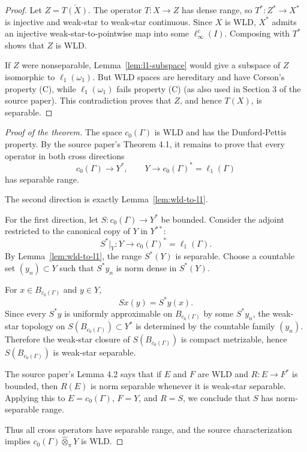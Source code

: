 \documentclass[11pt]{article}
\newcommand{\otpi}{\widehat{\otimes}_{\pi}}
\begin{document}
\begin{proof}
Let \(Z=\overline{T(X)}\). The operator \(T:X\to Z\) has dense range, so
\(T^*:Z^*\to X^*\) is injective and weak-star to weak-star continuous. Since
\(X\) is WLD, \(X^*\) admits an injective weak-star-to-pointwise map into some
\(\ell_\infty^c(I)\). Composing with \(T^*\) shows that \(Z\) is WLD.

If \(Z\) were nonseparable, Lemma~\ref{lem:l1-subspace} would give a subspace
of \(Z\) isomorphic to \(\ell_1(\omega_1)\). But WLD spaces are hereditary and
have Corson's property (C), while \(\ell_1(\omega_1)\) fails property (C)
(as also used in Section 3 of the source paper). This contradiction proves
that \(Z\), and hence \(T(X)\), is separable.
\end{proof}

\begin{proof}[Proof of the theorem]
The space \(c_0(\Gamma)\) is WLD and has the Dunford-Pettis property. By the
source paper's Theorem 4.1, it remains to prove that every operator in both
cross directions
\[
c_0(\Gamma)\to Y^*,\qquad Y\to c_0(\Gamma)^*=\ell_1(\Gamma)
\]
has separable range.

The second direction is exactly Lemma~\ref{lem:wld-to-l1}.

For the first direction, let \(S:c_0(\Gamma)\to Y^*\) be bounded. Consider
the adjoint restricted to the canonical copy of \(Y\) in \(Y^{**}\):
\[
S^*|_Y:Y\to c_0(\Gamma)^*=\ell_1(\Gamma).
\]
By Lemma~\ref{lem:wld-to-l1}, the range \(S^*(Y)\) is separable. Choose a
countable set \((y_n)\subset Y\) such that \(S^*y_n\) is norm dense in
\(S^*(Y)\).

For \(x\in B_{c_0(\Gamma)}\) and \(y\in Y\),
\[
Sx(y)=S^*y(x).
\]
Since every \(S^*y\) is uniformly approximable on \(B_{c_0(\Gamma)}\) by some
\(S^*y_n\), the weak-star topology on \(S(B_{c_0(\Gamma)})\subset Y^*\) is
determined by the countable family \((y_n)\). Therefore the weak-star closure
of \(S(B_{c_0(\Gamma)})\) is compact metrizable, hence
\(S(B_{c_0(\Gamma)})\) is weak-star separable.

The source paper's Lemma 4.2 says that if \(E\) and \(F\) are WLD and
\(R:E\to F^*\) is bounded, then \(R(E)\) is norm separable whenever it is
weak-star separable. Applying this to \(E=c_0(\Gamma)\), \(F=Y\), and \(R=S\),
we conclude that \(S\) has norm-separable range.

Thus all cross operators have separable range, and the source characterization
implies \(c_0(\Gamma)\otpi Y\) is WLD.
\end{proof}
\end{document}
